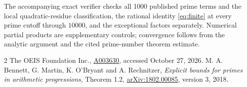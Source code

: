 \documentclass[10pt]{article}
\begin{document}
The accompanying exact verifier checks all 1000 published prime
terms and the local quadratic-residue classification, the rational
identity \eqref{eq:finite} at every prime cutoff through $10000$,
and the exceptional factors separately. Numerical partial products
are supplementary controls; convergence follows from the analytic
argument and the cited prime-number theorem estimate.

\begin{thebibliography}{2}
 The OEIS Foundation Inc.,
\href{https://oeis.org/A003630}{A003630}, accessed October 27, 2026.
 M. A. Bennett, G. Martin, K. O'Bryant and A. Rechnitzer,
\emph{Explicit bounds for primes in arithmetic progressions},
Theorem 1.2, \href{https://arxiv.org/abs/1802.00085}{arXiv:1802.00085},
version 3, 2018.
\end{thebibliography}
\end{document}
